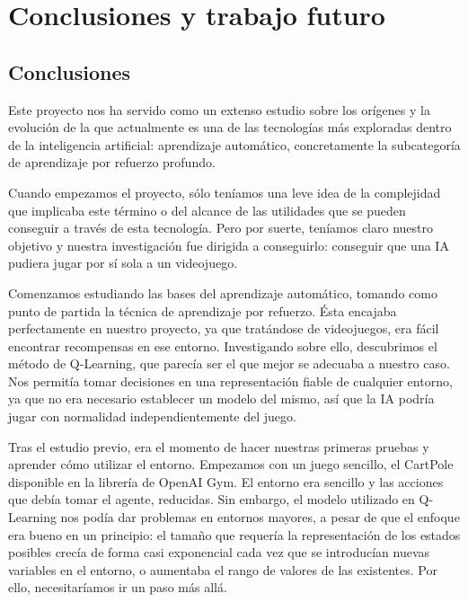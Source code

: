 \chapter{Conclusiones y trabajo futuro}
\label{cap:conclusiones}


\section{Conclusiones}

Este proyecto nos ha servido como un extenso estudio sobre los orígenes y la evolución de la que actualmente es una de las tecnologías más exploradas dentro de la inteligencia artificial: aprendizaje automático, concretamente la subcategoría de aprendizaje por refuerzo profundo. 

Cuando empezamos el proyecto, sólo teníamos una leve idea de la complejidad que implicaba este término o del alcance de las utilidades que se pueden conseguir a través de esta tecnología. Pero por suerte, teníamos claro nuestro objetivo y nuestra investigación fue dirigida a conseguirlo: conseguir que una IA pudiera jugar por sí sola a un videojuego.

Comenzamos estudiando las bases del aprendizaje automático, tomando como punto de partida la técnica de aprendizaje por refuerzo. Ésta encajaba perfectamente en nuestro proyecto, ya que tratándose de videojuegos, era fácil encontrar recompensas en ese entorno. Investigando sobre ello, descubrimos el método de Q-Learning, que parecía ser el que mejor se adecuaba a nuestro caso. Nos permitía tomar decisiones en una representación fiable de cualquier entorno, ya que no era necesario establecer un modelo del mismo, así que la IA podría jugar con normalidad independientemente del juego.

Tras el estudio previo, era el momento de hacer nuestras primeras pruebas y aprender cómo utilizar el entorno. Empezamos con un juego sencillo, el CartPole disponible en la librería de OpenAI Gym. El entorno era sencillo y las acciones que debía tomar el agente, reducidas. Sin embargo, el modelo utilizado en Q-Learning nos podía dar problemas en entornos mayores, a pesar de que el enfoque era bueno en un principio: el tamaño que requería la representación de los estados posibles crecía de forma casi exponencial cada vez que se introducían nuevas variables en el entorno, o aumentaba el rango de valores de las existentes. Por ello, necesitaríamos ir un paso más allá. 

